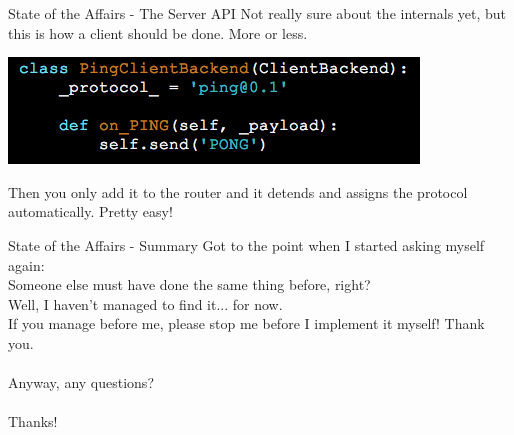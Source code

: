 \documentclass{beamer}
\begin{document}
\begin{frame}{State of the Affairs - The Server API}
  Not really sure about the internals yet, but this is how a client should
  be done. More or less.
  \begin{center}
	\includegraphics[width=\textwidth,height=0.9\textheight,keepaspectratio]{Resources/server-api.png}
  \end{center}
  Then you only add it to the router and it detends and assigns the protocol
  automatically. Pretty easy!
\end{frame}

\begin{frame}{State of the Affairs - Summary}
  Got to the point when I started asking myself again:\\Someone else must have
  done the same thing before, right?\\Well, I haven't managed to find it... for now.
  \\If you manage before me, please stop me before I implement it myself! Thank you.
  \\~\\
  Anyway, any questions?
  \\~\\
  Thanks!
\end{frame}
\end{document}
